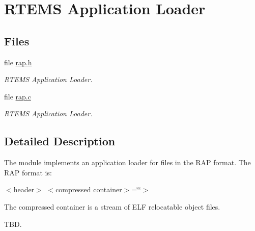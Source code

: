 \hypertarget{group__rtems__rap}{}\section{R\+T\+E\+MS Application Loader}
\label{group__rtems__rap}
\subsection*{Files}
\begin{DoxyCompactItemize}
\item 
file \mbox{\hyperlink{rap_8h}{rap.\+h}}
\begin{DoxyCompactList}\small\item\em R\+T\+E\+MS Application Loader. \end{DoxyCompactList}\item 
file \mbox{\hyperlink{rap_8c}{rap.\+c}}
\begin{DoxyCompactList}\small\item\em R\+T\+E\+MS Application Loader. \end{DoxyCompactList}\end{DoxyCompactItemize}


\subsection{Detailed Description}
The module implements an application loader for files in the R\+AP format. The R\+AP format is\+:

$<$header$>$ $<$compressed container$>$=\char`\"{}\char`\"{}$>$

The compressed container is a stream of E\+LF relocatable object files.

T\+BD. 